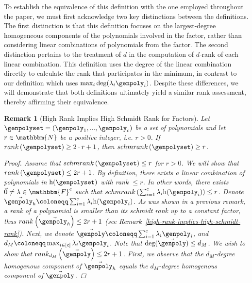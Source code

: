 \documentclass[10pt,a4paper]{article}
\newtheorem{remark}[theorem]{Remark}
\newcommand{\definedas}[0]{\coloneqq}
\newcommand{\parens}[1]{\left( #1 \right)}
\newcommand{\sparens}[1]{\left[ #1 \right]}
\newcommand{\basefield}[0]{\mathbbm{F}}
\newcommand{\degree}[0]{d}
\newcommand{\naturalnumbersset}[0]{\mathbbm{N}}
\newcommand{\homopart}[1]{\mathrm{h}({#1})}
\newcommand{\rank}[1]{rank \parens{#1}}
\newcommand{\drank}[2]{rank_{#1} \parens{#2}}
\newcommand{\schmrank}[1]{schmrank \parens{#1}}
\newcommand{\rankval}[0]{{{r}}}
\begin{document}
To establish the equivalence of this definition with the one employed throughout the paper, we must first acknowledge two key distinctions between the definitions.
The first distinction is that this definition focuses on the largest-degree homogeneous components of the polynomials involved in the factor, rather than considering linear combinations of polynomials from the factor.
The second distinction pertains to the treatment of $\degree$ in the computation of $\degree$-rank of each linear combination.
This definition uses the degree of the linear combination directly to calculate the rank that participates in the minimum, in contrast to our definition which uses $\max_{i}{\deg(\lambda_i \genpoly_i)}$.
Despite these differences, we will demonstrate that both definitions ultimately yield a similar rank assessment, thereby affirming their equivalence.
\begin{remark}[High Rank Implies High Schmidt Rank for Factors]
    Let $\genpolyset = \parens{\genpoly_1,...,\genpoly_c}$ be a set of polynomials and let $\rankval \in \naturalnumbersset$ be a positive integer, i.e. $\rankval > 0$.
    If $\rank{\genpolyset} \geq 2 \cdot \rankval + 1$, then $\schmrank{\genpolyset} \geq \rankval$.
    \begin{proof}
        Assume that $\schmrank{\genpolyset} \leq \rankval$ for $\rankval > 0$.
        We will show that $\rank{\genpolyset} \leq 2 \rankval + 1$.
        By definition, there exists a linear combination of polynomials in $\homopart{\genpolyset}$ with rank $\leq \rankval$.
        In other words, there exists $\vec{0} \neq \lambda \in \basefield^{c}$ such that $\schmrank{\sum_{i=1}^{c} {\lambda_i \homopart{\genpoly_i}}} \leq \rankval$.
        Denote $\vec{\genpoly_h} \definedas \sum_{i=1}^{c} {\lambda_i \homopart{\genpoly_i}} $.
        As was shown in a previous remark, a rank of a polynomial is smaller than its schmidt rank up to a constant factor,
        thus $\rank{\vec{\genpoly_h}} \leq 2\rankval + 1$ (see Remark~\ref{high-rank-implies-high-schmidt-rank}).
        \newline
        Next, we denote $\vec{\genpoly} \definedas \sum_{i=1}^{c} {\lambda_i \genpoly_i}$, and $\degree_M \definedas \max_{i \in \sparens{c}}{\lambda_i \genpoly_i}$.
        Note that  $\deg(\vec{\genpoly}) \leq \degree_M$.
        We wish to show that $\drank{\degree_M}{\vec{\genpoly}} \leq 2 \rankval + 1$.
        First, we observe that the $\degree_M$-degree homogenous component of $\vec{\genpoly_h}$ equals the $\degree_M$-degree homogenous component of $\vec{\genpoly}$.

\end{proof}
\end{remark}
\end{document}
